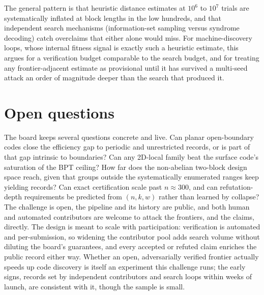 \documentclass{ceurart}
\begin{document}
The general pattern is that heuristic distance estimates at $10^6$ to $10^7$
trials are systematically inflated at block lengths in the low hundreds, and
that independent search mechanisms (information-set sampling versus
syndrome decoding) catch overclaims that either alone would miss. For
machine-discovery loops, whose internal fitness signal is exactly such a
heuristic estimate, this argues for a verification budget comparable to the
search budget, and for treating any frontier-adjacent estimate as provisional
until it has survived a multi-seed attack an order of magnitude deeper than
the search that produced it.

\section{Open questions}

The board keeps several questions concrete and live. Can planar
open-boundary codes close the efficiency gap to periodic and unrestricted
records, or is part of that gap intrinsic to boundaries? Can any 2D-local
family beat the surface code's saturation of the BPT ceiling? How far does
the non-abelian two-block design space reach, given that groups outside the
systematically enumerated ranges keep yielding records? Can exact
certification scale past $n\approx 300$, and can refutation-depth
requirements be predicted from $(n,k,w)$ rather than learned by collapse? The
challenge is open, the pipeline and its history are public, and both human
and automated contributors are welcome to attack the frontiers, and the
claims, directly. The design is meant to scale with participation:
verification is automated and per-submission, so widening the contributor
pool adds search volume without diluting the board's guarantees, and every
accepted or refuted claim enriches the public record either way. Whether an
open, adversarially verified frontier actually speeds up code discovery is
itself an experiment this challenge runs; the early signs, records set by
independent contributors and search loops within weeks of launch, are
consistent with it, though the sample is small.


\end{document}
